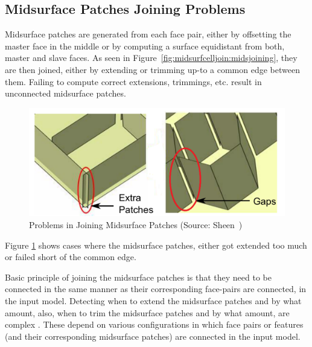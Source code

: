  
\subsection{Midsurface Patches Joining Problems} \label{sec:midsurfcelljoin:facepairinteraction}

Midsurface patches are generated from each face pair, either by offsetting the master face in the middle or by computing a surface equidistant from both, master and slave faces. As seen in Figure~\ref{fig:midsurfcelljoin:midsjoining}, they are then joined, either by extending or trimming up-to a common edge between them. Failing to compute correct extensions, trimmings, etc. result in unconnected midsurface patches.

\begin{figure}[h!]
	\centering 
	\includegraphics[width=0.62\linewidth]{images/patchjoiningproblems.pdf}
	\caption{Problems in Joining Midsurface Patches (Source: Sheen~\cite{Sheen2005}) }
	\label{fig:midsurfcelljoin:patchjoiningproblems}
	\end{figure}
	
Figure \ref{fig:midsurfcelljoin:patchjoiningproblems} shows cases where the midsurface patches, either got extended too much or failed short of the common edge. 


Basic principle of joining the midsurface patches is that they need to be connected in the same manner as their corresponding face-pairs are connected, in the input model. Detecting when to extend the midsurface patches and by what amount, also, when to trim the midsurface patches and by what amount, are complex . These depend on various configurations in which face pairs or features (and their corresponding midsurface patches) are connected in the input model.



